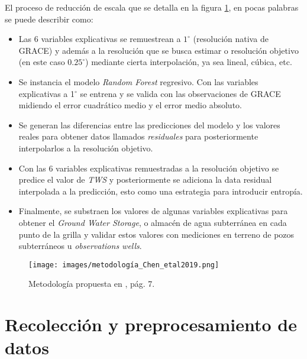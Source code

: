 El proceso de reducción de escala que se detalla en la figura \ref{metodologia}, en pocas palabras se puede describir
como:
\begin{itemize}

    \item Las 6 variables explicativas se remuestrean a $1^{\circ}$ (resolución 
    nativa de GRACE) y además a la resolución que se busca estimar o resolución objetivo (en este caso $0.25^{\circ}$) mediante 
    cierta interpolación, ya sea lineal, cúbica, etc.

    \item Se instancia el modelo \textit{Random Forest} regresivo. Con las variables explicativas a 1$^{\circ}$ se entrena y se valida
    con las observaciones de GRACE midiendo el error cuadrático medio y el error medio absoluto.
    
    \item Se generan las diferencias entre las predicciones del modelo y los valores reales para obtener
    datos llamados \textit{residuales} para posteriormente interpolarlos a la resolución objetivo.

    \item Con las 6 variables explicativas remuestradas a la resolución objetivo se predice el valor de \textit{TWS}
    y posteriormente se adiciona la data residual interpolada a la predicción, esto como una estrategia para introducir entropía.
    
    \item Finalmente, se substraen los valores de algunas variables explicativas para obtener el 
    \textit{Ground Water Storage}, o almacén de agua subterránea en cada punto de la grilla y validar estos valores con
    mediciones en terreno de pozos subterráneos u \textit{observations wells}.
    
\end{itemize}

\begin{figure}[ht]
    \centering
          \texttt{[image: images/metodología\_Chen\_etal2019.png]}
          \vskip -0.1in
    \caption[Metodología de reducción de dimensión propuesta]{\footnotesize Metodología propuesta en \cite{11}, pág. 7.}
    \label{metodologia}
\end{figure}


%
%
%
%
\section{Recolección y preprocesamiento de datos}



